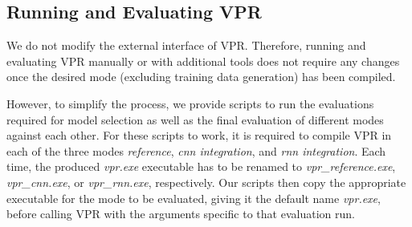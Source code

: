 \subsection{Running and Evaluating \gls{VPR}}

We do not modify the external interface of \gls{VPR}. Therefore, running and evaluating \gls{VPR} manually or with additional tools does not require any changes once the desired mode (excluding training data generation) has been compiled.

However, to simplify the process, we provide scripts to run the evaluations required for model selection as well as the final evaluation of different modes against each other. For these scripts to work, it is required to compile \gls{VPR} in each of the three modes \textit{reference}, \textit{cnn integration}, and \textit{rnn integration}. Each time, the produced \textit{vpr.exe} executable has to be renamed to \textit{vpr\_reference.exe}, \textit{vpr\_cnn.exe}, or \textit{vpr\_rnn.exe}, respectively. Our scripts then copy the appropriate executable for the mode to be evaluated, giving it the default name \textit{vpr.exe}, before calling \gls{VPR} with the arguments specific to that evaluation run.

